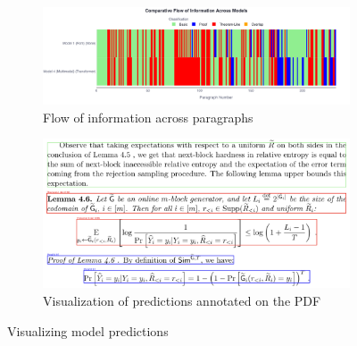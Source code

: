 \documentclass[runningheads]{llncs}
\begin{document}
\begin{figure}[h]
    \centering
    \begin{subfigure}[b]{0.6\textwidth}
        \centering
        \includegraphics[width=\textwidth]{images/comparitive-v3.png}
        \caption{Flow of information across paragraphs}
        \label{fig:model_comp}
    \end{subfigure}
    \hfill
    \begin{subfigure}[b]{0.35\textwidth}
        \centering
        \includegraphics[width=\textwidth]{images/vis_on_pdf.png}
        \caption{Visualization of predictions annotated on the PDF}
        \label{fig:vis_on_pdf}
    \end{subfigure}
    \caption{Visualizing model predictions}
    \label{fig:predictions_and_vis}
\end{figure}
\end{document}
